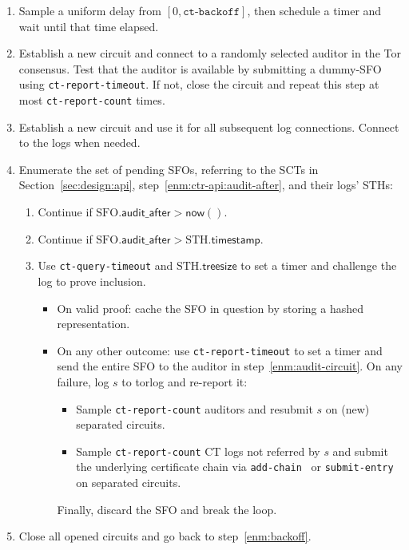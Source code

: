 \begin{enumerate}
	\item\label{enm:backoff} Sample a uniform delay from
			$[0, \texttt{ct-backoff}]$,
		then schedule a timer and wait until that time elapsed.
	\item\label{enm:audit-circuit} Establish a new circuit and connect to a
		randomly selected auditor in the Tor consensus.  Test that the
		auditor is available by submitting a dummy-SFO using
		\texttt{ct-report-timeout}.  If not, close the circuit and repeat this
		step at most \texttt{ct-report-count} times.
	\item\label{enm:log-circuit} Establish a new circuit and use it for all
		subsequent log connections.  Connect to the logs when needed.
	\item\label{enm:audit-loop} Enumerate the set of pending SFOs, referring to
		the SCTs in Section~\ref{sec:design:api},
		step~\ref{enm:ctr-api:audit-after}, and their logs' STHs:
		\begin{enumerate}
			\item\label{enm:audit-loop:wait-sct} Continue if
				$\textrm{SFO}.\mathsf{audit\_after} > \mathsf{now}()$.
			\item\label{enm:audit-loop:wait-sth} Continue if
				$\textrm{SFO}.\mathsf{audit\_after} >
				\textrm{STH}.\mathsf{timestamp}$.
			\item\label{enm:audit-loop:challenge}
				Use \texttt{ct-query-timeout} and
				$\textrm{STH}.\mathsf{treesize}$ to set a timer and challenge
				the log to prove inclusion.
				\begin{itemize}
					\item\label{enm:audit-loop:challenge:success} On valid
						proof: cache the SFO in question by storing a hashed
						representation.
					\item\label{enm:audit-loop:challenge:fail} On any other
						outcome: use \texttt{ct-report-timeout} to set a timer
						and send the entire SFO to the auditor in
						step~\ref{enm:audit-circuit}.  On any failure, log $s$
						to torlog and re-report it:
						\begin{itemize}
							\item Sample \texttt{ct-report-count}
								auditors and resubmit $s$ on (new) separated
								circuits.
							\item Sample \texttt{ct-report-count} CT logs not
								referred by $s$ and submit the underlying
								certificate chain via \texttt{add-chain}~\cite{ct}
								or \texttt{submit-entry}~\cite{ct/bis}
								on separated circuits.
						\end{itemize}
						Finally, discard the SFO and break the loop.
				\end{itemize}
		\end{enumerate}
	\item\label{enm:teardown} Close all opened circuits and go back to
		step~\ref{enm:backoff}.
\end{enumerate}

